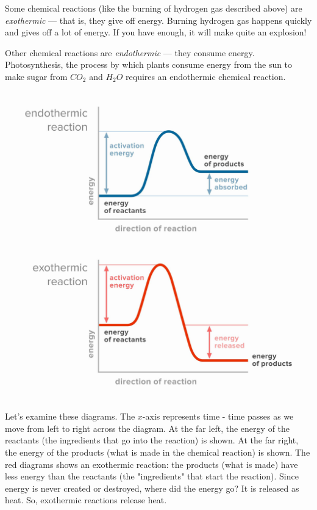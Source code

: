 Some chemical reactions (like the burning of hydrogen gas described above) are
\textit{exothermic} --- that is, they give off energy. Burning hydrogen gas 
happens quickly and gives off a lot of energy. If you have enough, it will make
quite an explosion! 

Other chemical reactions are \textit{endothermic} --- they consume energy. 
Photosynthesis, the process by which plants consume energy from the sun to make
sugar from $CO_2$ and $H_2O$ requires an endothermic chemical reaction.

\begin{center}
\includegraphics[scale=0.15]{exo_endo_diagrams.png}
\end{center}

Let's examine these diagrams. The $x$-axis represents time - time passes as we 
move from left to right across the diagram. At the far left, the energy of the 
reactants (the ingredients that go into the reaction) is shown. At the far 
right, the energy of the products (what is made in the chemical reaction) is 
shown. The red diagrams shows an exothermic reaction: the products (what is 
made) have less energy than the reactants (the "ingredients" that start the 
reaction). Since energy is never created or destroyed, where did the energy go?
It is released as heat. So, exothermic reactions release heat. 

